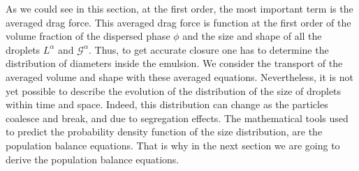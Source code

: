 As we could see in this section, at the first order, the most important term is the averaged drag force. 
This averaged drag force is function at the first order of the volume fraction of the dispersed phase $\phi$ and the size and shape of all the droplets $L^\alpha$ and $\mathcal{G}^\alpha$.
Thus, to get accurate closure one has to determine the distribution of diameters inside the emulsion.
We consider the transport of the averaged volume and shape with these averaged equations. 
Nevertheless, it is not yet possible to describe the evolution of the distribution of the size of droplets within time and space.  
Indeed, this distribution can change as the particles coalesce and break, and due to segregation effects.  
The mathematical tools used to predict the probability density function of the size distribution, are the population balance equations.
That is why in the next section we are going to derive the population balance equations.
